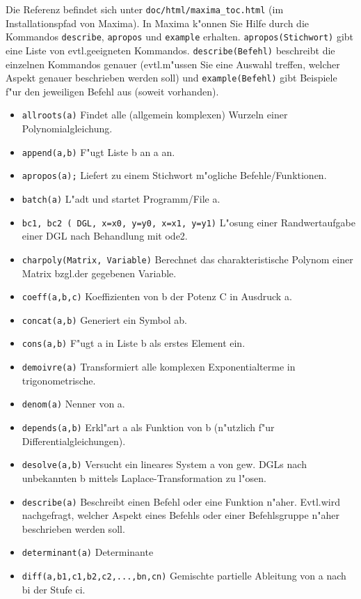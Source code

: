 \documentclass[ngerman,12pt,a4paper]{article}
\begin{document}
Die Referenz befindet sich unter \verb|doc/html/maxima_toc.html| (im Installationspfad von Maxima). In Maxima k"onnen Sie Hilfe durch die Kommandos \verb|describe|, \verb|apropos| und \verb|example| erhalten. \verb|apropos(Stichwort)| gibt eine Liste von evtl.\@ geeigneten Kommandos. \verb|describe(Befehl)| beschreibt die einzelnen Kommandos genauer (evtl.\@ m"ussen Sie eine Auswahl treffen, welcher Aspekt genauer beschrieben werden soll) und \verb|example(Befehl)| gibt Beispiele f"ur den jeweiligen Befehl aus (soweit vorhanden).

\begin{itemize}
\item \verb|allroots(a)| Findet alle (allgemein komplexen) Wurzeln einer Polynomialgleichung.
\item \verb|append(a,b)| F"ugt Liste b an a an.
\item \verb|apropos(a);| Liefert zu einem Stichwort m"ogliche Befehle/Funktionen.
\item \verb|batch(a)| L"adt und startet Programm/File a.
\item \verb|bc1, bc2 ( DGL, x=x0, y=y0, x=x1, y=y1)| L"osung einer Randwertaufgabe einer DGL nach Behandlung mit ode2.
\item \verb|charpoly(Matrix, Variable)| Berechnet das charakteristische Polynom einer Matrix bzgl.\@ der gegebenen Variable.
\item \verb|coeff(a,b,c)| Koeffizienten von b der Potenz C in Ausdruck a.
\item \verb|concat(a,b)| Generiert ein Symbol ab.
\item \verb|cons(a,b)| F"ugt a in Liste b als erstes Element ein.
\item \verb|demoivre(a)| Transformiert alle komplexen Exponentialterme in trigonometrische.
\item \verb|denom(a)| Nenner von a.
\item \verb|depends(a,b)| Erkl"art a als Funktion von b (n"utzlich f"ur Differentialgleichungen).
\item \verb|desolve(a,b)| Versucht ein lineares System a von gew. DGLs nach unbekannten b mittels Laplace-Transformation zu l"osen.
\item \verb|describe(a)| Beschreibt einen Befehl oder eine Funktion n"aher. Evtl.\@ wird nachgefragt, welcher Aspekt eines Befehls oder einer Befehlsgruppe n"aher beschrieben werden soll.
\item \verb|determinant(a)| Determinante
\item \verb|diff(a,b1,c1,b2,c2,...,bn,cn)| Gemischte partielle Ableitung von a nach bi der Stufe ci.

\end{itemize}
\end{document}
